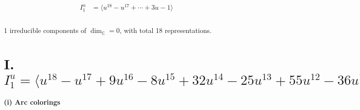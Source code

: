 \documentclass[1p]{elsarticle_modified}
\theoremstyle{definition}
\begin{document}
\begin{align*}
I^u_{1}&=\langle 
u^{18}- u^{17}+\cdots+3 u-1\rangle \\
\\
\end{align*}
\raggedright * 1 irreducible components of $\dim_{\mathbb{C}}=0$, with total 18 representations.\\
\newpage
\renewcommand{\arraystretch}{1}
\centering \section*{I. $I^u_{1}= \langle u^{18}- u^{17}+9 u^{16}-8 u^{15}+32 u^{14}-25 u^{13}+55 u^{12}-36 u^{11}+43 u^{10}-19 u^9+9 u^8+4 u^7+2 u^5+4 u^4-2 u^3- u^2+3 u-1 \rangle$}
\flushleft \textbf{(i) Arc colorings}\\
\end{document}
